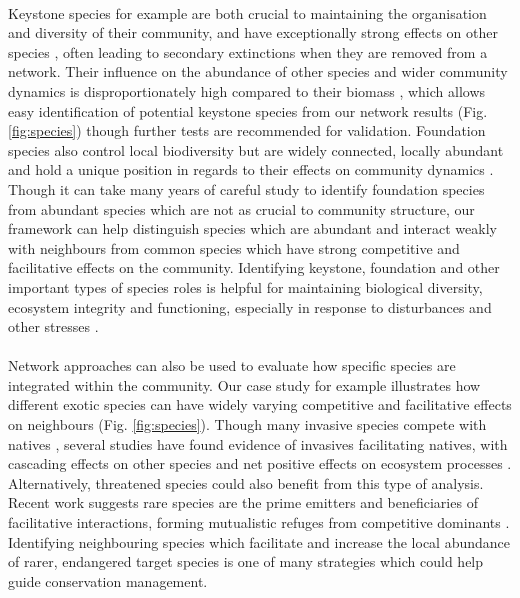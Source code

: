 \documentclass[a4,12pt]{article}
\begin{document}
         \paragraph{}
     Keystone species for example are both crucial to maintaining the organisation and diversity of their community, and have exceptionally strong effects on other species \parencite{Mills1993}, often leading to secondary extinctions when they are removed from a network. Their influence on the abundance of other species and wider community dynamics is disproportionately high compared to their biomass \parencite{Power1996, Piraino2002, Libralato2006}, which allows easy identification of potential keystone species from our network results (Fig. \ref{fig:species}) though further tests are recommended for validation. Foundation species also control local biodiversity but are widely connected, locally abundant and hold a unique position in regards to their effects on community dynamics \parencite{Ellison2005, Baiser2013, Ellison2019}. Though it can take many years of careful study to identify foundation species from abundant species which are not as crucial to community structure, our framework can help distinguish species which are abundant and interact weakly with neighbours from common species which have strong competitive and facilitative effects on the community. Identifying keystone, foundation and other important types of species roles is helpful for maintaining biological diversity, ecosystem integrity and functioning, especially in response to disturbances and other stresses \parencite{Nyakatya2008, Orwin2016, Losapio2017, Narwani2019}.

    \paragraph{}
    Network approaches can also be used to evaluate how specific species are integrated within the community. Our case study for example illustrates how different exotic species can have widely varying competitive and facilitative effects on neighbours (Fig. \ref{fig:species}). Though many invasive species compete with natives \parencite{Naeem2000, Riley2008, Zheng2015}, several studies have found evidence of invasives facilitating natives, with cascading effects on other species and net positive effects on ecosystem processes \parencite{Rodriguez2006, Ramus2017}. Alternatively, threatened species could also benefit from this type of analysis. Recent work suggests rare species are the prime emitters and beneficiaries of facilitative interactions, forming mutualistic refuges from competitive dominants \parencite{Calatayud2019, Hines2020}. Identifying neighbouring species which facilitate and increase the local abundance of rarer, endangered target species is one of many strategies which could help guide conservation management.
\end{document}
